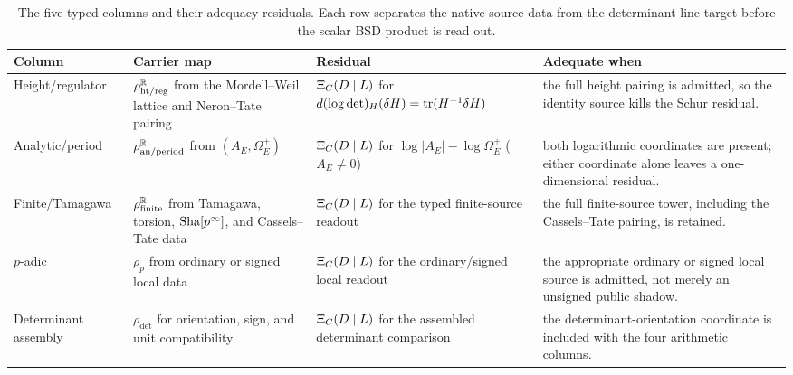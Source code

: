 \begin{table}[tbp]
\centering
\small
\caption{The five typed columns and their adequacy residuals.  Each row
separates the native source data from the determinant-line target before the
scalar BSD product is read out.}
\label{tab:five-column-map}
\begin{tabularx}{\textwidth}{@{}>{\raggedright\arraybackslash}p{}
>{\raggedright\arraybackslash}p{}
>{\raggedright\arraybackslash}p{}
>{\raggedright\arraybackslash}X@{}}
\toprule
Column & Carrier map & Residual & Adequate when \\
\midrule
Height/regulator &
\(\rho_{\mathrm{ht/reg}}^{\mathbb{R}}\) from the Mordell--Weil lattice and
Neron--Tate pairing &
\(\Xi_C(D\mid L)\) for \(d(\log\det)_H(\delta H)=\operatorname{tr}(H^{-1}\delta H)\) &
the full height pairing is admitted, so the identity source kills the Schur
residual. \\
\addlinespace
Analytic/period &
\(\rho_{\mathrm{an/period}}^{\mathbb{R}}\) from \((A_E,\Omega_E^+)\) &
\(\Xi_C(D\mid L)\) for \(\log|A_E|-\log\Omega_E^+\) (\(A_E\neq0\)) &
both logarithmic coordinates are present; either coordinate alone leaves a
one-dimensional residual. \\
\addlinespace
Finite/Tamagawa &
\(\rho_{\mathrm{finite}}^{\mathbb{R}}\) from Tamagawa, torsion, \(\operatorname{Sha}[p^\infty]\),
and Cassels--Tate data &
\(\Xi_C(D\mid L)\) for the typed finite-source readout &
the full finite-source tower, including the Cassels--Tate pairing, is
retained. \\
\addlinespace
\(p\)-adic &
\(\rho_p\) from ordinary or signed local data &
\(\Xi_C(D\mid L)\) for the ordinary/signed local readout &
the appropriate ordinary or signed local source is admitted, not merely an
unsigned public shadow. \\
\addlinespace
Determinant assembly &
\(\rho_{\det}\) for orientation, sign, and unit compatibility &
\(\Xi_C(D\mid L)\) for the assembled determinant comparison &
the determinant-orientation coordinate is included with the four arithmetic
columns. \\
\bottomrule
\end{tabularx}
\end{table}
